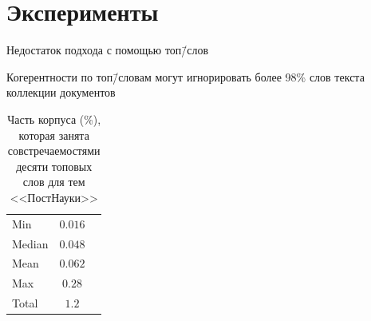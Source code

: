 \documentclass[sans, mathsans, russian]{beamer}
\begin{document}
\section{Эксперименты}


\begin{frame}{Недостаток подхода с помощью топ\=/слов}
  \begin{block}{}
    Когерентности по топ\=/словам могут игнорировать более 98\% слов текста коллекции документов
  \end{block}
  
  \bigskip
  
  \begin{table}[h]
    \centering
    \captionsetup{justification=centering}
    
    \begin{tabular}{lcc}
      \toprule
      Min & $0.016$\\%
      Median & $0.048$\\%
      Mean & $0.062$\\%
      Max & $0.28$\\%
      \midrule
      Total & $\mathbf{1.2}$\\%
      \bottomrule
    \end{tabular}
    \vspace{0.5cm}
    \caption*{Часть корпуса (\%), которая занята совстречаемостями десяти топовых слов для тем <<ПостНауки>>}
  \end{table}
\end{frame}
\end{document}
